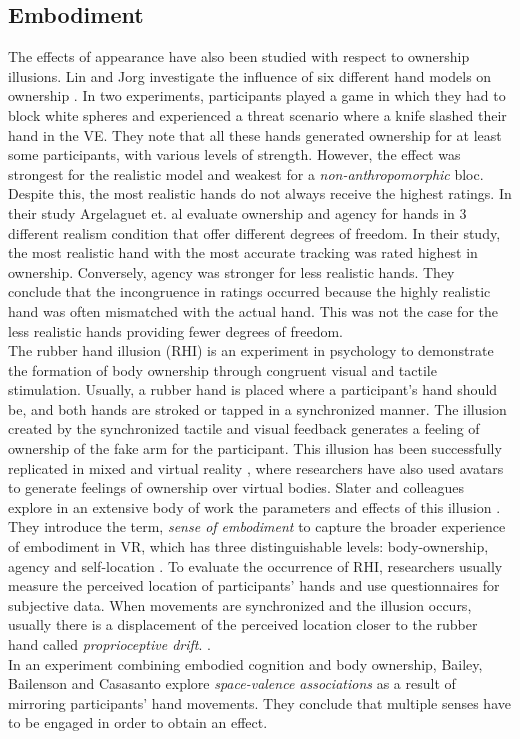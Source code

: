 \subsection{Embodiment}
The effects of appearance have also been studied with respect to ownership illusions. Lin and Jorg investigate the influence of six different hand models on ownership \cite{lin2016need}. In two experiments, participants played a game in which they had to block white spheres and experienced a threat scenario where a knife slashed their hand in the VE. They note that all these hands generated ownership for at least some participants, with various levels of strength. However, the effect was strongest for the realistic model and weakest for a \textit{non-anthropomorphic} bloc. Despite this, the most realistic hands do not always receive the highest ratings. In their study Argelaguet et. al \cite{ argelaguet2016role} evaluate ownership and agency for hands in 3 different realism condition that offer different degrees of freedom. In their study, the most realistic hand with the most accurate tracking was rated highest in ownership. Conversely, agency was stronger for less realistic hands. They conclude that the incongruence in ratings occurred because the highly realistic hand was often mismatched with the actual hand. This was not the case for the less realistic hands providing fewer degrees of freedom.
\\
The rubber hand illusion\cite{botvinick1998rubber} (RHI) is an experiment in psychology to demonstrate the formation of body ownership through congruent visual and tactile stimulation. Usually, a rubber hand is placed where a participant's hand should be, and both hands are stroked or tapped in a synchronized manner. The illusion created by the synchronized tactile and visual feedback generates a feeling of ownership of the fake arm for the participant. This illusion has been successfully replicated in mixed \cite{ijsselsteijn2006my} and virtual reality \cite{slater2008towards},  where researchers have also used avatars to generate feelings of ownership over virtual bodies. Slater and colleagues explore in an extensive body of work the parameters and effects of this illusion \cite{slater2009inducing}. They introduce the term, \textit{sense of embodiment} to capture the broader experience of embodiment in VR, which has three distinguishable levels: body-ownership, agency and self-location \cite{kilteni2012sense}. To evaluate the occurrence of RHI, researchers usually measure the perceived location of participants' hands and use questionnaires for subjective data. When movements are synchronized and the illusion occurs, usually there is a displacement of the perceived location closer to the rubber hand called \textit{proprioceptive drift}. \cite{rohde2011rubber}. \\
In an experiment combining embodied cognition and body ownership, Bailey, Bailenson and Casasanto \cite{bailey2016does} explore \textit{space-valence associations} as a result of mirroring participants' hand movements. They conclude that multiple senses have to be engaged in order to obtain an effect. \\

